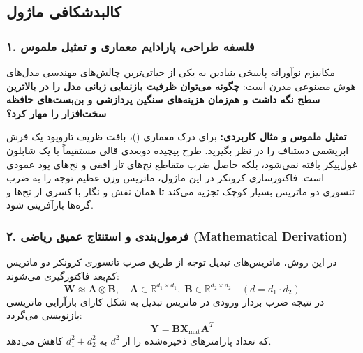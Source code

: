 \subsection{کالبدشکافی ماژول }

\subsubsection*{۱. فلسفه طراحی، پارادایم معماری و تمثیل ملموس}
مکانیزم نوآورانه  پاسخی بنیادین به یکی از حیاتی‌ترین چالش‌های مهندسی مدل‌های هوش مصنوعی مدرن است: \textbf{چگونه می‌توان ظرفیت بازنمایی زبانی مدل را در بالاترین سطح نگه داشت و هم‌زمان هزینه‌های سنگین پردازشی و بن‌بست‌های حافظه سخت‌افزار را مهار کرد؟}

\textbf{تمثیل ملموس و مثال کاربردی:}
برای درک معماری  ()، بافت ظریف تاروپود یک فرش ابریشمی دستباف را در نظر بگیرید. طرح پیچیده دوبعدی قالی مستقیماً با یک شابلون غول‌پیکر بافته نمی‌شود، بلکه حاصل ضرب متقاطع نخ‌های تار افقی و نخ‌های پود عمودی است. فاکتورسازی کرونکر در این ماژول، ماتریس وزن عظیم توجه را به ضرب تنسوری دو ماتریس بسیار کوچک تجزیه می‌کند تا همان نقش و نگار با کسری از نخ‌ها و گره‌ها بازآفرینی شود.

\subsubsection*{۲. فرمول‌بندی و استنتاج عمیق ریاضی (Mathematical Derivation)}
در این روش، ماتریس‌های تبدیل توجه از طریق ضرب تانسوری کرونکر دو ماتریس کم‌بعد فاکتورگیری می‌شوند:
\begin{equation}
\mathbf{W} \approx \mathbf{A} \otimes \mathbf{B}, \quad \mathbf{A} \in \mathbb{R}^{d_1 \times d_1}, \; \mathbf{B} \in \mathbb{R}^{d_2 \times d_2} \quad (d = d_1 \cdot d_2)
\end{equation}
در نتیجه ضرب بردار ورودی در ماتریس تبدیل به شکل کارای بازآرایی ماتریسی بازنویسی می‌گردد:
\begin{equation}
\mathbf{Y} = \mathbf{B} \mathbf{X}_{\text{mat}} \mathbf{A}^T
\end{equation}
که تعداد پارامترهای ذخیره‌شده را از $d^2$ به $d_1^2 + d_2^2$ کاهش می‌دهد.

